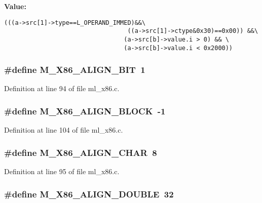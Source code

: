 \textbf{Value:}

\begin{Code}\begin{verbatim}(((a->src[1]->type==L_OPERAND_IMMED)&&\
                                  ((a->src[1]->ctype&0x30)==0x00)) &&\
                                 (a->src[b]->value.i > 0) && \
                                 (a->src[b]->value.i < 0x2000))
\end{verbatim}\end{Code}
\subsubsection{\setlength{\rightskip}{0pt plus 5cm}\#define M\_\-X86\_\-ALIGN\_\-BIT~1}\label{ml__x86_8c_6a3cf9cb641a38f00f496402319a3d0f}




Definition at line 94 of file ml\_\-x86.c.
\subsubsection{\setlength{\rightskip}{0pt plus 5cm}\#define M\_\-X86\_\-ALIGN\_\-BLOCK~-1}\label{ml__x86_8c_3068a03182423cfa8ea6a125777a95b5}




Definition at line 104 of file ml\_\-x86.c.
\subsubsection{\setlength{\rightskip}{0pt plus 5cm}\#define M\_\-X86\_\-ALIGN\_\-CHAR~8}\label{ml__x86_8c_11b2ed1f8419865b52dd3bf9e1025a48}




Definition at line 95 of file ml\_\-x86.c.
\subsubsection{\setlength{\rightskip}{0pt plus 5cm}\#define M\_\-X86\_\-ALIGN\_\-DOUBLE~32}\label{ml__x86_8c_be4ce7a7035eea2dab73cf7afd7d3be9}




